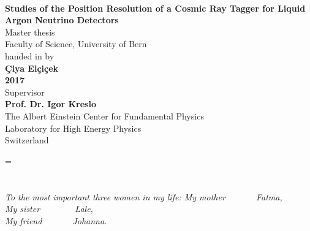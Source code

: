 \documentclass[a4paper]{article}\linespread{1.4}
\begin{document}
\begin{titlepage}
\center
\textbf{\large }\\[2cm] { \large \bfseries Studies of the Position Resolution of a Cosmic Ray Tagger for Liquid Argon Neutrino Detectors}\\[2.9cm] 
\textsf{\large } {\large Master thesis}\\[0cm] 
\textsf{\large } {\large Faculty of Science, University of Bern}\\[1cm]
\textsf{\large } {\large handed in by}\\[0.2cm] 
\textbf{\large } {\large \bfseries  Çiya Elçiçek}\\[1.5cm] 
\textbf{\large } {\large \bfseries  2017}\\[4cm] 
\textsf{\large } {\large Supervisor}\\[0.2cm] 
\textbf{\large } {\large \bfseries  Prof. Dr. Igor Kreslo}\\[1.5cm] 
\textbf{\large } {\large The Albert Einstein Center for Fundamental Physics}\\[0cm]
\textbf{\large } {\large Laboratory for High Energy Physics}\\[0cm]  
\textbf{\large } {\large Switzerland}\\[0cm] 
\vfill 
\end{titlepage}


\emergencystretch=\maxdimen
{}

\renewcommand*\rmdefault{ppl}
\thispagestyle{empty}

\section*{} 
\vspace*{\fill}
\begin{center}
\begin{minipage}{.6\textwidth}
\itshape{\large } {To the most important three women in my life:}
\itshape{\large } { \scriptsize My mother}~~~~~~~Fatma,\\
\itshape{\large } { \scriptsize My sister}~~~~~~~~Lale,\\
\itshape{\large } { \scriptsize My friend}~~~~~~~Johanna.
\end{minipage}
\end{center}
\vfill
\end{document}
